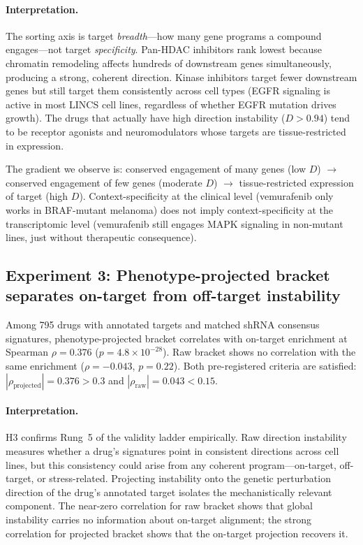 \documentclass{article}
\begin{document}
\paragraph{Interpretation.}
The sorting axis is target \emph{breadth}---how many gene programs a compound
engages---not target \emph{specificity}. Pan-HDAC inhibitors rank lowest
because chromatin remodeling affects hundreds of downstream genes
simultaneously, producing a strong, coherent direction. Kinase inhibitors
target fewer downstream genes but still target them consistently across cell
types (EGFR signaling is active in most LINCS cell lines, regardless of
whether EGFR mutation drives growth). The drugs that actually have high
direction instability ($D > 0.94$) tend to be receptor agonists and
neuromodulators whose targets are tissue-restricted in expression.

The gradient we observe is: conserved engagement of many genes (low $D$)
$\to$ conserved engagement of few genes (moderate $D$) $\to$ tissue-restricted
expression of target (high $D$). Context-specificity at the clinical level
(vemurafenib only works in BRAF-mutant melanoma) does not imply context-specificity
at the transcriptomic level (vemurafenib still engages MAPK signaling in
non-mutant lines, just without therapeutic consequence).

\subsection{Experiment 3: Phenotype-projected bracket separates on-target from off-target instability}

Among 795 drugs with annotated targets and matched shRNA consensus signatures,
phenotype-projected bracket correlates with on-target enrichment at Spearman
$\rho = 0.376$ ($p = 4.8 \times 10^{-28}$). Raw bracket shows no correlation
with the same enrichment ($\rho = -0.043$, $p = 0.22$). Both pre-registered
criteria are satisfied: $|\rho_{\text{projected}}| = 0.376 > 0.3$ and
$|\rho_{\text{raw}}| = 0.043 < 0.15$.

\paragraph{Interpretation.}
H3 confirms Rung~5 of the validity ladder empirically. Raw direction
instability measures whether a drug's signatures point in consistent
directions across cell lines, but this consistency could arise from any
coherent program---on-target, off-target, or stress-related. Projecting
instability onto the genetic perturbation direction of the drug's annotated
target isolates the mechanistically relevant component. The near-zero
correlation for raw bracket shows that global instability carries no
information about on-target alignment; the strong correlation for projected
bracket shows that the on-target projection recovers it.
\end{document}
